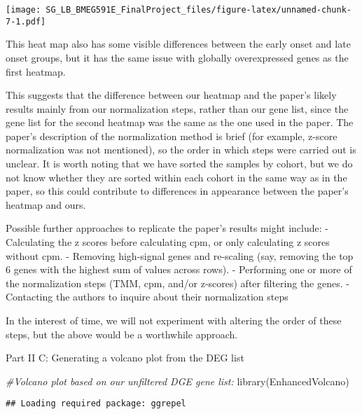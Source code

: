 \documentclass[
]{article}
\newenvironment{Shaded}{\begin{snugshade}}{\end{snugshade}}
\newcommand{\CommentTok}[1]{\textcolor[rgb]{0.56,0.35,0.01}{\textit{#1}}}
\newcommand{\FunctionTok}[1]{\textcolor[rgb]{0.00,0.00,0.00}{#1}}
\newcommand{\NormalTok}[1]{#1}
\begin{document}
\texttt{[image: SG\_LB\_BMEG591E\_FinalProject\_files/figure-latex/unnamed-chunk-7-1.pdf]}

This heat map also has some visible differences between the early onset
and late onset groups, but it has the same issue with globally
overexpressed genes as the first heatmap.

This suggests that the difference between our heatmap and the paper's
likely results mainly from our normalization steps, rather than our gene
list, since the gene list for the second heatmap was the same as the one
used in the paper. The paper's description of the normalization method
is brief (for example, z-score normalization was not mentioned), so the
order in which steps were carried out is unclear. It is worth noting
that we have sorted the samples by cohort, but we do not know whether
they are sorted within each cohort in the same way as in the paper, so
this could contribute to differences in appearance between the paper's
heatmap and ours.

Possible further approaches to replicate the paper's results might
include: - Calculating the z scores before calculating cpm, or only
calculating z scores without cpm. - Removing high-signal genes and
re-scaling (say, removing the top 6 genes with the highest sum of values
across rows). - Performing one or more of the normalization steps (TMM,
cpm, and/or z-scores) after filtering the genes. - Contacting the
authors to inquire about their normalization steps

In the interest of time, we will not experiment with altering the order
of these steps, but the above would be a worthwhile approach.

Part II C: Generating a volcano plot from the DEG list

\begin{Shaded}
\begin{Highlighting}[]
\CommentTok{\#Volcano plot based on our unfiltered DGE gene list:}
\FunctionTok{library}\NormalTok{(EnhancedVolcano)}
\end{Highlighting}
\end{Shaded}

\begin{verbatim}
## Loading required package: ggrepel
\end{verbatim}
\end{document}
